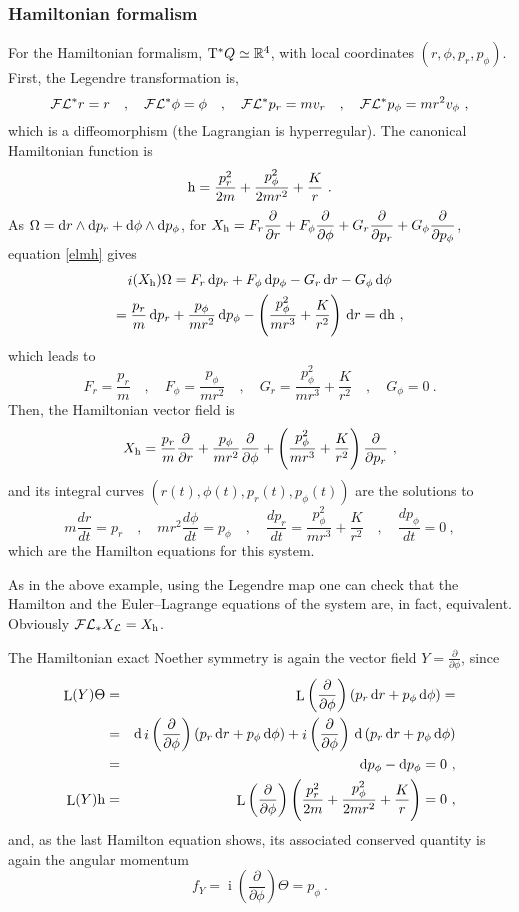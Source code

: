 \documentclass[12pt]{report}
\def\beann{\begin{eqnarray*}}
\def\eeann{\end{eqnarray*}}
\def\dst{\displaystyle}
\def\derpar#1#2{\frac{\partial{#1}}{\partial{#2}}}
\def\Lag{{\cal L}}
\def\d{{\rm d}}
\def\Real{\mathbb{R}}
\def\Tan{{\rm T}}
\def\Lie{\mathop{\rm L}\nolimits}
\def\inn{\mathop{i}\nolimits}
\def\Leg{{\cal F}\Lag}
\begin{document}
\subsubsection{Hamiltonian formalism}


For the Hamiltonian formalism, $\Tan^*Q\simeq\Real^4$,
with local coordinates $(r,\phi,p_r,p_\phi)$. First, the Legendre transformation is,
$$
\Leg^*r=r  \quad , \quad \Leg^*\phi=\phi  \quad , \quad
\Leg^*p_r=mv_r  \quad , \quad \Leg^*p_\phi=mr^2v_\phi\ ,
$$
which is a diffeomorphism (the Lagrangian is hyperregular).
The canonical Hamiltonian function is
$$
{\rm h}=\frac{p_r^2}{2m}+\frac{p_\phi^2}{2mr^2}+\frac{K}{r} \ .
$$
As $\Omega=\d r\wedge\d p_r+\d \phi\wedge\d p_\phi$,
for $\displaystyle X_{\rm h}=F_r\derpar{}{r}+F_\phi\derpar{}{\phi}+
G_r\derpar{}{p_r}+G_\phi\derpar{}{p_\phi}$,
equation \eqref{elmh} gives
\begin{multline*}
\inn(X_{\rm h})\Omega= 
F_r\, \d p_r+F_\phi\, \d p_\phi-G_r\, \d r-G_\phi\, \d \phi\\
=\frac{p_r}{m}\, \d p_r+\frac{p_\phi}{mr^2}\, \d p_\phi-
\left(\frac{p_\phi^2}{mr^3}+\frac{K}{r^2}\right)\, \d r=\d{\rm h}\ ,
\end{multline*}
which leads to
$$
F_r=\frac{p_r}{m} \quad , \quad F_\phi=\frac{p_\phi}{mr^2} \quad , \quad
G_r=\frac{p_\phi^2}{mr^3}+\frac{K}{r^2} \quad , \quad G_\phi=0  \ .
$$
Then, the Hamiltonian vector field is
$$
X_{\rm h}=\frac{p_r}{m}\derpar{}{r}+\frac{p_\phi}{mr^2}\derpar{}{\phi}+\left(\frac{p_\phi^2}{mr^3}+\frac{K}{r^2}\right)\derpar{}{p_r} \ ,
$$
and its integral curves $(r(t),\phi(t),p_r(t),p_\phi(t))$ are the solutions to
$$
m\frac{dr}{dt} =p_r \quad , \quad mr^2\frac{d\phi}{dt} =p_\phi \quad , \quad
\frac{dp_r}{dt}=\frac{p_\phi^2}{mr^3}+\frac{K}{r^2} \quad , \quad
\frac{dp_\phi}{dt}=0 \ ,
$$
which are the Hamilton equations for this system.

As in the above example, using the Legendre map
one can check that the Hamilton and
the Euler--Lagrange equations of the system are, in fact, equivalent.
Obviously $\Leg_*X_\Lag=X_{\rm h}$.

The Hamiltonian exact Noether symmetry is again the
vector field $\dst Y=\derpar{}{\phi}$, since
\beann
\Lie(Y)\Theta&=& 
\Lie\left(\derpar{}{\phi}\right)\left(p_r\,\d r+p_\phi\,\d\phi\right) =\\ &=&
\d\inn\left(\derpar{}{\phi}\right)\left(p_r\,\d r+p_\phi\,\d\phi\right) +
\inn\left(\derpar{}{\phi}\right)\,\d\left(p_r\,\d r+p_\phi\,\d\phi\right)  \\ &=&
\d p_\phi-\d p_\phi=0 \ , 
\\
\Lie(Y){\rm h}&=& 
\Lie\left(\derpar{}{\phi}\right)\left(\frac{p_r^2}{2m}+\frac{p_\phi^2}{2mr^2}+\frac{K}{r}\right)=0 \ ,
\eeann
and, as the last Hamilton equation shows,
 its associated conserved quantity is again the angular momentum
$$
f_Y=\inn\left(\derpar{}{\phi}\right)\Theta=p_\phi \ .
$$
\end{document}
